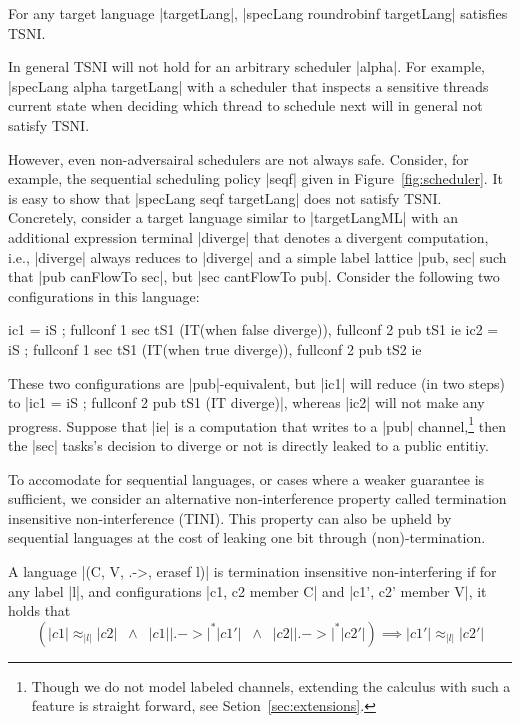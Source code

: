 \begin{theorem}
  \label{thm:rr-tsni}
For any target language |targetLang|, |specLang roundrobinf
targetLang| satisfies TSNI.
\end{theorem}

In general TSNI will not hold for an arbitrary scheduler |alpha|.
%
For example, |specLang alpha targetLang| with a scheduler that inspects a
sensitive threads current state when deciding which thread to schedule next
will in general not satisfy TSNI.
%
%

However, even non-adversairal schedulers are not always safe.
Consider, for example, the sequential scheduling policy |seqf| given in
Figure~\ref{fig:scheduler}.
%
It is easy to show that |specLang seqf targetLang| does not satisfy
TSNI.
%
Concretely, consider a target language similar to |targetLangML| with an
additional expression terminal |diverge| that denotes a divergent computation,
i.e., |diverge| always reduces to |diverge| and a simple label lattice |{pub,
sec}| such that |pub canFlowTo sec|, but |sec cantFlowTo pub|.
Consider the following two configurations in this language:
\begin{code}
ic1 = iS ; fullconf 1 sec tS1 (IT(when false diverge)),  fullconf 2 pub tS1 ie
ic2 = iS ; fullconf 1 sec tS1 (IT(when true diverge)),   fullconf 2 pub tS2 ie
\end{code}
These two configurations are |pub|-equivalent, but |ic1| will reduce (in two
steps) to |ic1 = iS ; fullconf 2 pub tS1 (IT diverge)|, whereas |ic2| will not make
any progress.
%
Suppose that |ie| is a computation that writes to a |pub| channel,\footnote{
Though we do not model labeled channels, extending the calculus with such a
feature is straight forward, see Setion~\ref{sec:extensions}.}
then the |sec| tasks's decision to diverge or not is directly leaked to a
public entitiy.

%
To accomodate for sequential languages, or cases where a weaker guarantee
is sufficient, we consider an alternative non-interference property called termination insensitive
non-interference (TINI).  This property can also be upheld by sequential languages at the cost
of leaking one bit through (non)-termination.
%
\begin{definition}
  A language |(C, V, .->, erasef l)| is termination
  insensitive non-interfering if for any label |l|, and configurations
  |c1, c2 member C| and |c1', c2' member V|, it holds that
  \[
    (|c1| \approx_{|l|} |c2|
    \;\;\land\;\;
    |c1| |.->|^* |c1'|
    \;\;\land\;\;
    |c2| |.->|^* |c2'|)
    \implies
    |c1'| \approx_{|l|} |c2'|
  \]
\end{definition}

